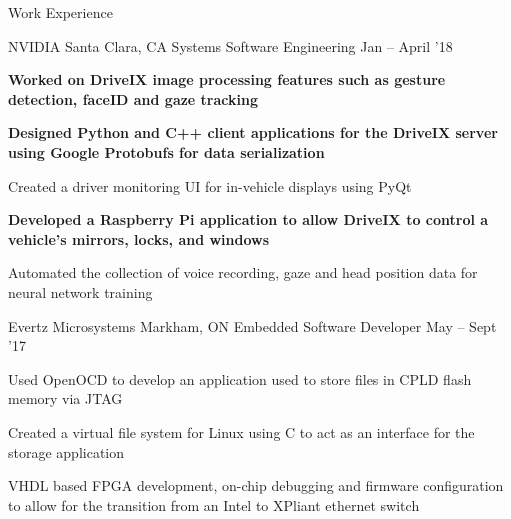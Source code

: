 \documentclass{resume} %
\begin{document}
	\begin{rSection}{Work Experience}
		\begin{rSubsection}{NVIDIA}
			{Santa Clara, CA}
			{Systems Software Engineering}
			{Jan -- April '18}
			
        \item \textbf{Worked on DriveIX image processing features such as gesture detection, faceID and gaze tracking}
        \item \textbf{Designed Python and C++ client applications for the DriveIX server using Google Protobufs for data serialization}
            \item Created a driver monitoring UI for in-vehicle displays using PyQt
            \item \textbf{Developed a Raspberry Pi application to allow DriveIX to control a vehicle's mirrors, locks, and windows}
            \item Automated the collection of voice recording, gaze and head position data for neural network training
		\end{rSubsection}
		
        \begin{rSubsection}{Evertz Microsystems}
			{Markham, ON}
			{Embedded Software Developer}
			{May -- Sept '17}
			
			\item Used OpenOCD to develop an application used to store files in CPLD flash memory via JTAG
		 	\item Created a virtual file system for Linux using C to act as an interface for the storage application
			\item VHDL based FPGA development, on-chip debugging and firmware configuration to allow for the transition from an Intel to XPliant ethernet switch
		\end{rSubsection}
		

\end{rSection}
\end{document}
